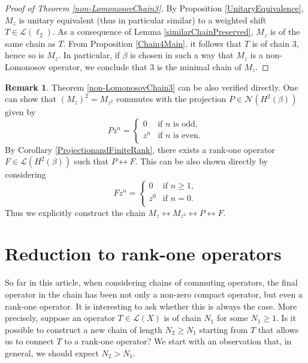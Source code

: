 \documentclass[a4paper,12pt]{article}
\theoremstyle{definition}
\newtheorem{remark}[thm]{Remark}
\numberwithin{equation}{section}
\numberwithin{thm}{section}
\begin{document}
\begin{proof}[Proof of Theorem \ref{non-LomonosovChain3}]
By Proposition \ref{UnitaryEquivalence}, $M_z$ is unitary equivalent (thus in particular similar) to a weighted shift $T\in \mathcal{L}(\ell_2)$. As a consequence of Lemma \ref{similarChainPreserved}, $M_z$ is of the same chain as $T$. From Proposition \ref{Chain4Main}, it follows that $T$ is of chain $3$, hence so is $M_z$. In particular, if $\beta$ is chosen in such a way that $M_z$ is a non-Lomonosov operator, we conclude that $3$ is the minimal chain of $M_z$.
\end{proof}

\begin{remark}
Theorem \ref{non-LomonosovChain3} can be also verified directly. One can show that $(M_z)^2 = M_{z^2}$ commutes with the projection $P\in \mathcal{N}(H^2(\beta))$ given by
$$
Pz^n = 
     \begin{cases}
       0 &\text{if $n$ is odd},\\
       z^n &\text{if $n$ is even}.\\
     \end{cases}
$$
By Corollary \ref{ProjectionandFiniteRank}, there exists a rank-one operator $F\in \mathcal{L}(H^2(\beta))$ such that $P\leftrightarrow F$. This can be also shown directly by considering
$$   
Fz^n = 
     \begin{cases}
       0 &\text{if } n\geq 1,\\
       z^0 &\text{if } n=0.\\
     \end{cases}
$$
Thus we explicitly construct the chain $M_z \leftrightarrow M_{z^2} \leftrightarrow P \leftrightarrow F.$
\end{remark}

\section{Reduction to rank-one operators}
\label{sec:reducton_to_rank-one}

So far in this article, when considering chains of commuting operators, the final operator in the chain has been not only a non-zero compact operator, but even a rank-one operator. It is interesting to ask whether this is always the case. More precisely, suppose an operator $T\in \mathcal{L}(X)$ is of chain $N_1$ for some $N_1\geq 1$. Is it possible to construct a new chain of length $N_2\geq N_1$ starting from $T$ that allows us to connect $T$ to a rank-one operator? We start with an observation that, in general, we should expect $N_2 > N_1$.
\end{document}
